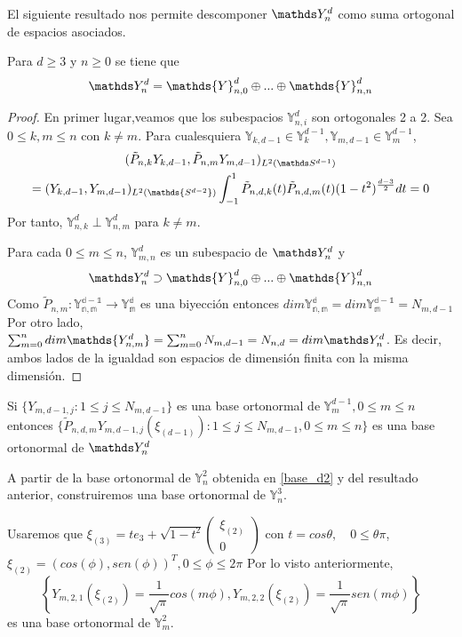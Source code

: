 El siguiente resultado nos permite descomponer $\spharm$ como suma ortogonal de espacios asociados.
\begin{thm}Para $d\ge 3$ y $n\ge 0$ se tiene que $$
	\spharm = \mathds{Y}^d_{n,0} \oplus ... \oplus \mathds{Y}^d_{n,n}
$$
\end{thm}
\begin{proof}
En primer lugar,veamos que los subespacios $\mathds{Y}^d_{n,i}$ son ortogonales 2 a 2. Sea $0\le k,m\le n$ con $k \neq m$. Para cualesquiera $\mathds{Y}_{k,d-1}\in\mathds{Y}_k^{d-1},\mathds{Y}_{m,d-1}\in\mathds{Y}_m^{d-1}$,
\begin{gather}
(\tilde{P}_{n,k}Y_{k,d-1},\tilde{P}_{n,m}Y_{m,d-1})_{L^2(\sphere)} \\= (Y_{k,d-1},Y_{m,d-1})_{L^2(\mathds{S^{d-2}})}\int_{-1}^{1} \tilde{P}_{n,d,k}(t)\tilde{P}_{n,d,m}(t)(1-t^2)^{\frac{d-3}{2}}dt = 0
\end{gather}
Por tanto, $\mathds{Y}^d_{n,k}\perp\mathds{Y}^d_{n,m}$ para $k\neq m$.

Para cada $0\le m\le n$, $\mathds{Y}^d_{m,n}$ es un subespacio de $\spharm$ y $$
\spharm \supset \mathds{Y}^d_{n,0} \oplus ... \oplus \mathds{Y}^d_{n,n}$$
Como $\tilde{P}_{n,m}:\mathds{Y_{n,m}^{d-1}} \to \mathds{Y_{m}^{d}}$ es una biyección entonces $dim \mathds{Y_{n,m}^{d}} = dim \mathds{Y_{m}^{d-1}} = N_{m,d-1}$
Por otro lado, $\sum_{m=0}^{n} dim \mathds{Y_{n,m}^{d}} = \sum_{m=0}^{n} N_{m,d-1} =  N_{n,d} = dim \spharm$.
Es decir, ambos lados de la igualdad son espacios de dimensión finita con la misma dimensión.
\end{proof}
\begin{rem}Si $\{Y_{m,d-1,j}:1\le j \le N_{m,d-1}\}$ es una base ortonormal de $\mathds{Y}_m^{d-1}, 0\le m\le n$ entonces $\{\tilde{P}_{n,d,m}Y_{m,d-1,j}(\xi_{(d-1)}):1\le j \le N_{m,d-1}, 0\le m \le n\}$ es una base ortonormal de $\spharm$
\end{rem}
A partir de la base ortonormal de $\mathds{Y}^2_n$ obtenida en \hyperref[]{\ref{base_d2}} y del resultado anterior, construiremos una base ortonormal de $\mathds{Y}^3_n$.
\bigskip

Usaremos que
$ \xi_{(3)} = te_3 + \sqrt{1-t^2}\begin{pmatrix}
\xi_{(2)} \\
0
\end{pmatrix}$ con $t=cos \theta, \quad 0\le\theta\pi$, $\xi_{(2)}=(cos(\phi),sen(\phi))^T, 0\le\phi \le 2\pi$
Por lo visto anteriormente, 
$$
\left\{Y_{m,2,1}(\xi_{(2)})=\frac{1}{\sqrt{\pi}}cos(m\phi),Y_{m,2,2}(\xi_{(2)})=\frac{1}{\sqrt{\pi}}sen(m\phi)\right\}
$$
es una base ortonormal de $\mathds{Y}^2_m$.

